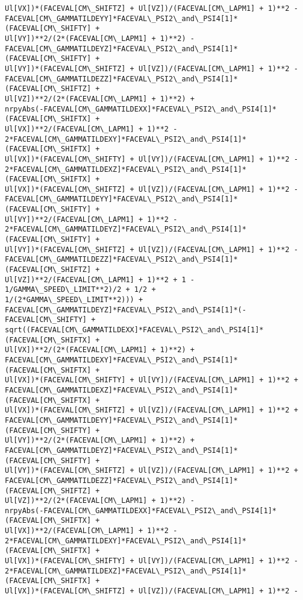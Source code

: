 \documentclass[landscape,letterpaper,10pt,english]{article}
\begin{document}
\begin{Verbatim}[commandchars=\\\{\}]
Ul[VX])*(FACEVAL[CM\_SHIFTZ] + Ul[VZ])/(FACEVAL[CM\_LAPM1] + 1)**2 -
FACEVAL[CM\_GAMMATILDEYY]*FACEVAL\_PSI2\_and\_PSI4[1]*(FACEVAL[CM\_SHIFTY] +
Ul[VY])**2/(2*(FACEVAL[CM\_LAPM1] + 1)**2) -
FACEVAL[CM\_GAMMATILDEYZ]*FACEVAL\_PSI2\_and\_PSI4[1]*(FACEVAL[CM\_SHIFTY] +
Ul[VY])*(FACEVAL[CM\_SHIFTZ] + Ul[VZ])/(FACEVAL[CM\_LAPM1] + 1)**2 -
FACEVAL[CM\_GAMMATILDEZZ]*FACEVAL\_PSI2\_and\_PSI4[1]*(FACEVAL[CM\_SHIFTZ] +
Ul[VZ])**2/(2*(FACEVAL[CM\_LAPM1] + 1)**2) +
nrpyAbs(-FACEVAL[CM\_GAMMATILDEXX]*FACEVAL\_PSI2\_and\_PSI4[1]*(FACEVAL[CM\_SHIFTX] +
Ul[VX])**2/(FACEVAL[CM\_LAPM1] + 1)**2 -
2*FACEVAL[CM\_GAMMATILDEXY]*FACEVAL\_PSI2\_and\_PSI4[1]*(FACEVAL[CM\_SHIFTX] +
Ul[VX])*(FACEVAL[CM\_SHIFTY] + Ul[VY])/(FACEVAL[CM\_LAPM1] + 1)**2 -
2*FACEVAL[CM\_GAMMATILDEXZ]*FACEVAL\_PSI2\_and\_PSI4[1]*(FACEVAL[CM\_SHIFTX] +
Ul[VX])*(FACEVAL[CM\_SHIFTZ] + Ul[VZ])/(FACEVAL[CM\_LAPM1] + 1)**2 -
FACEVAL[CM\_GAMMATILDEYY]*FACEVAL\_PSI2\_and\_PSI4[1]*(FACEVAL[CM\_SHIFTY] +
Ul[VY])**2/(FACEVAL[CM\_LAPM1] + 1)**2 -
2*FACEVAL[CM\_GAMMATILDEYZ]*FACEVAL\_PSI2\_and\_PSI4[1]*(FACEVAL[CM\_SHIFTY] +
Ul[VY])*(FACEVAL[CM\_SHIFTZ] + Ul[VZ])/(FACEVAL[CM\_LAPM1] + 1)**2 -
FACEVAL[CM\_GAMMATILDEZZ]*FACEVAL\_PSI2\_and\_PSI4[1]*(FACEVAL[CM\_SHIFTZ] +
Ul[VZ])**2/(FACEVAL[CM\_LAPM1] + 1)**2 + 1 - 1/GAMMA\_SPEED\_LIMIT**2)/2 + 1/2 +
1/(2*GAMMA\_SPEED\_LIMIT**2))) +
FACEVAL[CM\_GAMMATILDEYZ]*FACEVAL\_PSI2\_and\_PSI4[1]*(-FACEVAL[CM\_SHIFTY] +
sqrt((FACEVAL[CM\_GAMMATILDEXX]*FACEVAL\_PSI2\_and\_PSI4[1]*(FACEVAL[CM\_SHIFTX] +
Ul[VX])**2/(2*(FACEVAL[CM\_LAPM1] + 1)**2) +
FACEVAL[CM\_GAMMATILDEXY]*FACEVAL\_PSI2\_and\_PSI4[1]*(FACEVAL[CM\_SHIFTX] +
Ul[VX])*(FACEVAL[CM\_SHIFTY] + Ul[VY])/(FACEVAL[CM\_LAPM1] + 1)**2 +
FACEVAL[CM\_GAMMATILDEXZ]*FACEVAL\_PSI2\_and\_PSI4[1]*(FACEVAL[CM\_SHIFTX] +
Ul[VX])*(FACEVAL[CM\_SHIFTZ] + Ul[VZ])/(FACEVAL[CM\_LAPM1] + 1)**2 +
FACEVAL[CM\_GAMMATILDEYY]*FACEVAL\_PSI2\_and\_PSI4[1]*(FACEVAL[CM\_SHIFTY] +
Ul[VY])**2/(2*(FACEVAL[CM\_LAPM1] + 1)**2) +
FACEVAL[CM\_GAMMATILDEYZ]*FACEVAL\_PSI2\_and\_PSI4[1]*(FACEVAL[CM\_SHIFTY] +
Ul[VY])*(FACEVAL[CM\_SHIFTZ] + Ul[VZ])/(FACEVAL[CM\_LAPM1] + 1)**2 +
FACEVAL[CM\_GAMMATILDEZZ]*FACEVAL\_PSI2\_and\_PSI4[1]*(FACEVAL[CM\_SHIFTZ] +
Ul[VZ])**2/(2*(FACEVAL[CM\_LAPM1] + 1)**2) -
nrpyAbs(-FACEVAL[CM\_GAMMATILDEXX]*FACEVAL\_PSI2\_and\_PSI4[1]*(FACEVAL[CM\_SHIFTX] +
Ul[VX])**2/(FACEVAL[CM\_LAPM1] + 1)**2 -
2*FACEVAL[CM\_GAMMATILDEXY]*FACEVAL\_PSI2\_and\_PSI4[1]*(FACEVAL[CM\_SHIFTX] +
Ul[VX])*(FACEVAL[CM\_SHIFTY] + Ul[VY])/(FACEVAL[CM\_LAPM1] + 1)**2 -
2*FACEVAL[CM\_GAMMATILDEXZ]*FACEVAL\_PSI2\_and\_PSI4[1]*(FACEVAL[CM\_SHIFTX] +
Ul[VX])*(FACEVAL[CM\_SHIFTZ] + Ul[VZ])/(FACEVAL[CM\_LAPM1] + 1)**2 -

\end{Verbatim}
\end{document}
